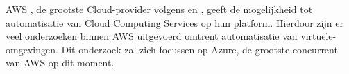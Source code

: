 \begin{comment}

Hier beschrijf je de \emph{state-of-the-art} rondom je gekozen onderzoeksdomein, d.w.z.\ een inleidende, doorlopende tekst over het onderzoeksdomein van je bachelorproef. Je steunt daarbij heel sterk op de professionele \emph{vakliteratuur}, en niet zozeer op populariserende teksten voor een breed publiek. Wat is de huidige stand van zaken in dit domein, en wat zijn nog eventuele open vragen (die misschien de aanleiding waren tot je onderzoeksvraag!)?

Je mag de titel van deze sectie ook aanpassen (literatuurstudie, stand van zaken, enz.). Zijn er al gelijkaardige onderzoeken gevoerd? Wat concluderen ze? Wat is het verschil met jouw onderzoek?

Verwijs bij elke introductie van een term of bewering over het domein naar de vakliteratuur, bijvoorbeeld~\autocite{Hykes2013}! Denk zeker goed na welke werken je refereert en waarom.

Draag zorg voor correcte literatuurverwijzingen! Een bronvermelding hoort thuis \emph{binnen} de zin waar je je op die bron baseert, dus niet er buiten! Maak meteen een verwijzing als je gebruik maakt van een bron. Doe dit dus \emph{niet} aan het einde van een lange paragraaf. Baseer nooit teveel aansluitende tekst op eenzelfde bron.

Als je informatie over bronnen verzamelt in JabRef, zorg er dan voor dat alle nodige info aanwezig is om de bron terug te vinden (zoals uitvoerig besproken in de lessen Research Methods).


Je mag deze sectie nog verder onderverdelen in subsecties als dit de structuur van de tekst kan verduidelijken.

\end{comment}

AWS \autocite{AWS2022}, de grootste Cloud-provider volgens \textcite{Vailshery2022} en \textcite{SRG2022}, geeft de mogelijkheid tot automatisatie van Cloud Computing Services op hun platform. Hierdoor zijn er veel onderzoeken binnen AWS uitgevoerd omtrent automatisatie van virtuele-omgevingen. Dit onderzoek zal zich focussen op Azure, de grootste concurrent van AWS op dit moment.

